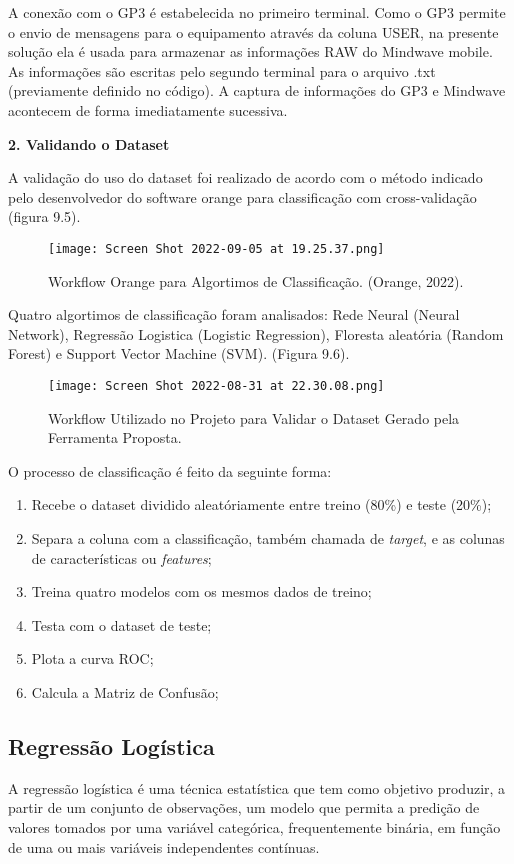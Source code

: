  A conexão com o GP3 é estabelecida no primeiro terminal. Como o GP3 permite 
 o envio de mensagens para o equipamento através da coluna USER, na presente solução ela é
 usada para armazenar as informações RAW do Mindwave mobile. As informações são escritas 
 pelo segundo terminal para o arquivo .txt (previamente definido no código). A captura de informações 
 do GP3 e Mindwave acontecem de forma imediatamente sucessiva. 

 \textbf{2. Validando o Dataset}

A validação do uso do dataset foi realizado de acordo com o método indicado pelo 
desenvolvedor do software orange para classificação com cross-validação (figura 9.5). 

 \begin{figure}[!h]
    \centering
    \texttt{[image: Screen Shot 2022-09-05 at 19.25.37.png]}
    \caption{Workflow Orange para Algortimos de Classificação. (Orange, 2022).}
\end{figure}

Quatro algortimos de classificação foram
analisados: Rede Neural (Neural Network), Regressão Logistica (Logistic Regression), Floresta aleatória (Random Forest)
e Support Vector Machine (SVM). (Figura 9.6). 

 \begin{figure}[!h]
    \centering
    \texttt{[image: Screen Shot 2022-08-31 at 22.30.08.png]}
    \caption{Workflow Utilizado no Projeto para Validar o Dataset Gerado pela Ferramenta Proposta.}
\end{figure}

O processo de classificação é feito da seguinte forma:

\begin{enumerate}
    \item Recebe o dataset dividido aleatóriamente entre treino (80\%) e teste (20\%);
    \item Separa a coluna com a classificação, também chamada de \textit{target}, e as colunas de características ou \textit{features};
    \item Treina quatro modelos com os mesmos dados de treino;
    \item Testa com o dataset de teste;
    \item Plota a curva ROC;
    \item Calcula a Matriz de Confusão;
\end{enumerate}



\subsection{Regressão Logística}
A regressão logística é uma técnica estatística que tem como objetivo produzir, a partir de um conjunto de observações, um modelo que permita a predição de valores tomados por uma variável categórica, 
frequentemente binária, em função de uma ou mais variáveis independentes contínuas.

